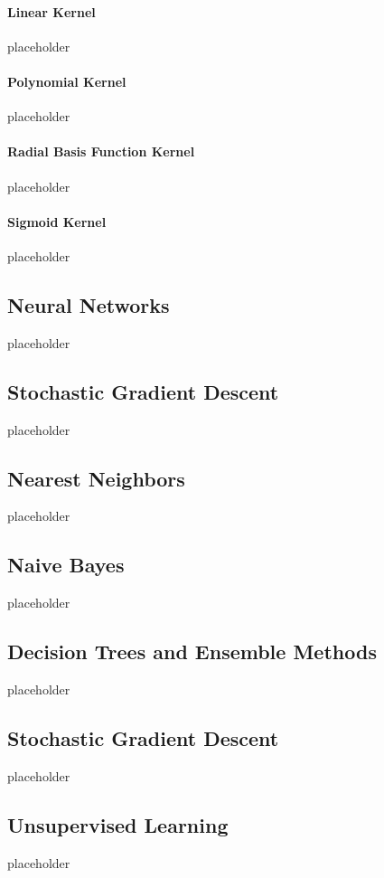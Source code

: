 	\paragraph{Linear Kernel}
	{\color{red}placeholder}
	\paragraph{Polynomial Kernel}
	{\color{red} placeholder}
	\paragraph{Radial Basis Function Kernel}
	{\color{red} placeholder}
	\paragraph{Sigmoid Kernel}
	{\color{red} placeholder}
	
	\subsection*{Neural Networks}
	{\color{red} placeholder} \cite{bishop1995neural}
	\subsection*{Stochastic Gradient Descent}
	{\color{red} placeholder}
	\subsection*{Nearest Neighbors}
	{\color{red} placeholder} \cite{bay1998combining}
	\subsection*{Naive Bayes}
	{\color{red} placeholder} \cite{rish2001empirical}
	\subsection*{Decision Trees and Ensemble Methods}
	{\color{red} placeholder}
	\cite{quinlan2014c4} \cite{breiman1984classification}
	\subsection*{Stochastic Gradient Descent}
	{\color{red} placeholder}
	
	\newpage
	\subsection{Unsupervised Learning}
	{\color{red} placeholder}
